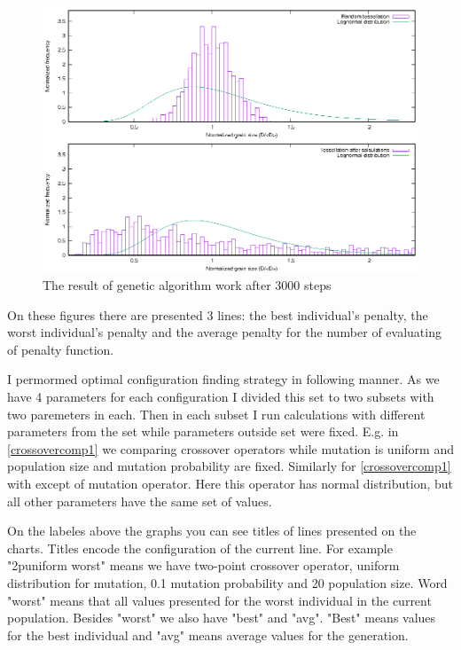 \documentclass{article}
\begin{document}
\begin{figure}
    \centering
    \includegraphics[width=5.0in]{first_last_comparison}
    \caption{The result of genetic algorithm work after 3000 steps}
    \label{firstlastcomp}
\end{figure}

On these figures there are presented 3 lines: the best individual's penalty, the worst individual's penalty and the average penalty for the number of evaluating of penalty function.

I permormed optimal configuration finding strategy in following manner. As we have 4 parameters for each configuration I divided this set to two subsets with two paremeters in each. Then in each subset I run calculations with different parameters from the set while parameters outside set were fixed. E.g. in \ref{crossovercomp1} we comparing crossover operators while mutation is uniform and population size and mutation probability are fixed. Similarly for \ref{crossovercomp1} with except of mutation operator. Here this operator has normal distribution, but all other parameters have the same set of values. 

On the labeles above the graphs you can see titles of lines presented on the charts. Titles encode the configuration of the current line. For example "2p\textunderscore uniform worst" means we have two-point crossover operator, uniform distribution for mutation, 0.1 mutation probability and 20 population size. Word "worst" means that all values presented for the worst individual in the current population. Besides "worst" we also have "best" and "avg". "Best" means values for the best individual and "avg" means average values for the generation.
\end{document}
